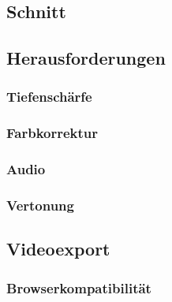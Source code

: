 \subsection{Schnitt}

\subsection{Herausforderungen}
\subsubsection{Tiefenschärfe}
\subsubsection{Farbkorrektur}
\subsubsection{Audio}
\subsubsection{Vertonung}

\subsection{Videoexport}
\subsubsection{Browserkompatibilität}
